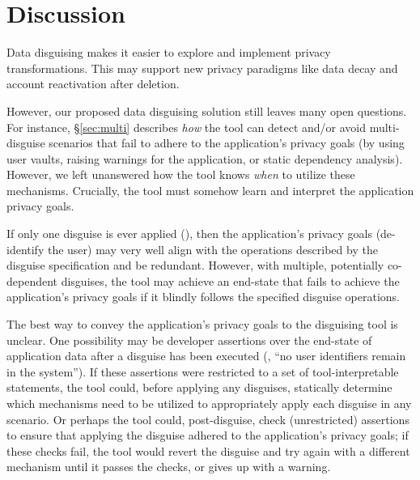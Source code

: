 \section{Discussion}
Data disguising makes it easier to explore and implement privacy transformations. This may support
new privacy paradigms like data decay and account reactivation after deletion.

However, our proposed data disguising solution still leaves many open questions. 
%
For instance, \S\ref{sec:multi} describes \emph{how} the tool can detect and/or avoid
multi-disguise scenarios that fail to adhere to the application's privacy goals (by \eg using user
vaults, raising warnings for the application, or static dependency analysis). However, we left
unanswered how the tool knows \emph{when} to utilize these mechanisms. Crucially, the tool must
somehow learn and interpret the application privacy goals.

If only one disguise is ever applied (\eg \gdpr), then the application's
privacy goals (\eg de-identify the user) may very well align with the operations described by the
disguise specification and be redundant.  However, with multiple, potentially co-dependent disguises,
the tool may achieve an end-state that fails to achieve the application's privacy goals if it
blindly follows the specified disguise operations.

The best way to convey the application's privacy goals to the disguising tool is unclear. One 
possibility may be developer assertions over the end-state of application data after a disguise
has been executed (\eg, ``no user identifiers remain in the system''). If these assertions were restricted to a
set of tool-interpretable statements, the tool could, before applying any disguises,
statically determine which mechanisms need to be utilized to appropriately apply each disguise in any scenario. 
Or perhaps the tool could, post-disguise, check (unrestricted) assertions to ensure that applying
the disguise adhered to the application's privacy goals; if these checks fail, the tool would revert
the disguise and try again with a different mechanism until it passes the checks, or gives up with a
warning.

